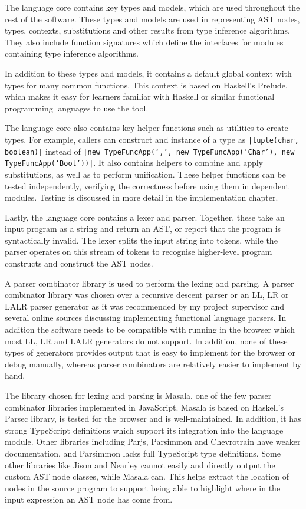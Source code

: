 \documentclass[a4paper,fleqn,oneside,12pt]{report}
\begin{document}
The language core contains key types and models, which are used throughout the rest of the software. These types and models are used in representing AST nodes, types, contexts, substitutions and other results from type inference algorithms. They also include function signatures which define the interfaces for modules containing type inference algorithms.

In addition to these types and models, it contains a default global context with types for many common functions. This context is based on Haskell’s Prelude, which makes it easy for learners familiar with Haskell or similar functional programming languages to use the tool.

The language core also contains key helper functions such as utilities to create types. For example, callers can construct and instance of a type as \texttt{|tuple(char, boolean)|} instead of \texttt{|new TypeFuncApp(‘,’, new TypeFuncApp(‘Char’), new TypeFuncApp(‘Bool’))|}. It also contains helpers to combine and apply substitutions, as well as to perform unification. These helper functions can be tested independently, verifying the correctness before using them in dependent modules. Testing is discussed in more detail in the implementation chapter.

Lastly, the language core contains a lexer and parser. Together, these take an input program as a string and return an AST, or report that the program is syntactically invalid. The lexer splits the input string into tokens, while the parser operates on this stream of tokens to recognise higher-level program constructs and construct the AST nodes.

A parser combinator library is used to perform the lexing and parsing. A parser combinator library was chosen over a recursive descent parser or an LL, LR or LALR parser generator as it was recommended by my project supervisor and several online sources discussing implementing functional language parsers. In addition the software needs to be compatible with running in the browser which most LL, LR and LALR generators do not support. In addition, none of these types of generators provides output that is easy to implement for the browser or debug manually, whereas parser combinators are relatively easier to implement by hand.

The library chosen for lexing and parsing is Masala, one of the few parser combinator libraries implemented in JavaScript. Masala is based on Haskell’s Parsec library, is tested for the browser and is well-maintained. In addition, it has strong TypeScript definitions which support its integration into the language module. Other libraries including Parjs, Parsimmon and Chevrotrain have weaker documentation, and Parsimmon lacks full TypeScript type definitions. Some other libraries like Jison and Nearley cannot easily and directly output the custom AST node classes, while Masala can. This helps extract the location of nodes in the source program to support being able to highlight where in the input expression an AST node has come from.
\end{document}
